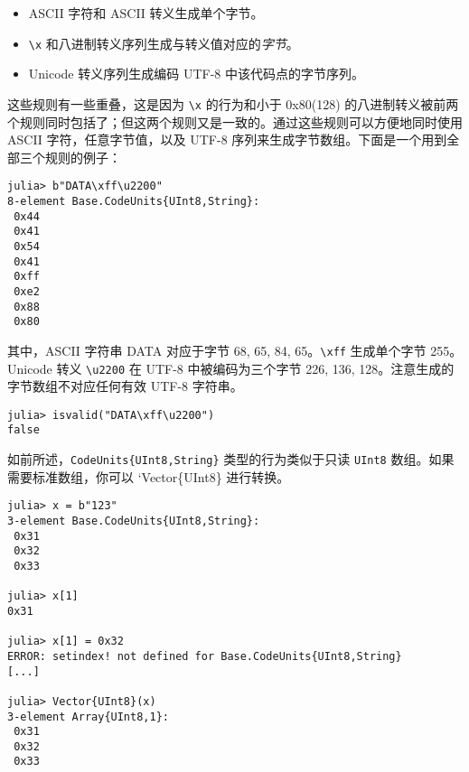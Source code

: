 \begin{itemize}
\item ASCII 字符和 ASCII 转义生成单个字节。


\item \texttt{{\textbackslash}x} 和八进制转义序列生成与转义值对应的\emph{字节}。


\item Unicode 转义序列生成编码 UTF-8 中该代码点的字节序列。

\end{itemize}


这些规则有一些重叠，这是因为 \texttt{{\textbackslash}x} 的行为和小于 0x80(128) 的八进制转义被前两个规则同时包括了；但这两个规则又是一致的。通过这些规则可以方便地同时使用 ASCII 字符，任意字节值，以及 UTF-8 序列来生成字节数组。下面是一个用到全部三个规则的例子：




\begin{verbatim}
julia> b"DATA\xff\u2200"
8-element Base.CodeUnits{UInt8,String}:
 0x44
 0x41
 0x54
 0x41
 0xff
 0xe2
 0x88
 0x80
\end{verbatim}



其中，ASCII 字符串 {\textquotedbl}DATA{\textquotedbl} 对应于字节 68, 65, 84, 65。\texttt{{\textbackslash}xff} 生成单个字节 255。Unicode 转义 \texttt{{\textbackslash}u2200} 在 UTF-8 中被编码为三个字节 226, 136, 128。注意生成的字节数组不对应任何有效 UTF-8 字符串。




\begin{verbatim}
julia> isvalid("DATA\xff\u2200")
false
\end{verbatim}



如前所述，\texttt{CodeUnits\{UInt8,String\}} 类型的行为类似于只读 \texttt{UInt8} 数组。如果需要标准数组，你可以 `Vector\{UInt8\} 进行转换。




\begin{verbatim}
julia> x = b"123"
3-element Base.CodeUnits{UInt8,String}:
 0x31
 0x32
 0x33

julia> x[1]
0x31

julia> x[1] = 0x32
ERROR: setindex! not defined for Base.CodeUnits{UInt8,String}
[...]

julia> Vector{UInt8}(x)
3-element Array{UInt8,1}:
 0x31
 0x32
 0x33
\end{verbatim}



